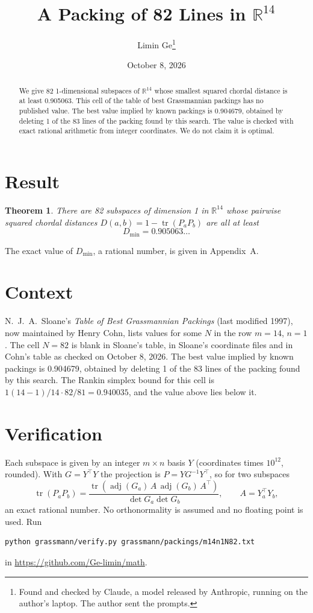 \documentclass[11pt,a4paper]{article}
\title{A Packing of 82 Lines in $\mathbb{R}^{14}$}
\author{Limin Ge\thanks{Found and checked by Claude, a model released by Anthropic, running on the author's laptop. The author sent the prompts.}}
\date{October 8, 2026}
\newtheorem*{theorem}{Theorem}
\begin{document}
\maketitle
\begin{abstract}
We give 82 1-dimensional subspaces of $\mathbb{R}^{14}$ whose smallest squared chordal distance is at least 0.905063. This cell of the table of best Grassmannian packings has no published value. The best value implied by known packings is 0.904679, obtained by deleting 1 of the 83 lines of the packing found by this search. The value is checked with exact rational arithmetic from integer coordinates. We do not claim it is optimal.
\end{abstract}

\section{Result}
\begin{theorem}
There are 82 subspaces of dimension 1 in $\mathbb{R}^{14}$ whose pairwise squared chordal distances $D(a,b) = 1 - \operatorname{tr}(P_aP_b)$ are all at least
\[ D_{\min} = 0.905063\ldots \]
\end{theorem}
The exact value of $D_{\min}$, a rational number, is given in Appendix~A.


\section{Context}
N.~J.~A.~Sloane's \emph{Table of Best Grassmannian Packings} (last modified 1997), now maintained by Henry Cohn, lists values for some $N$ in the row $m=14$, $n=1$. The cell $N=82$ is blank in Sloane's table, in Sloane's coordinate files and in Cohn's table as checked on October 8, 2026. The best value implied by known packings is 0.904679, obtained by deleting 1 of the 83 lines of the packing found by this search. The Rankin simplex bound for this cell is $1(14-1)/14\cdot 82/81 = 0.940035$, and the value above lies below it.


\section{Verification}
Each subspace is given by an integer $m\times n$ basis $Y$ (coordinates times $10^{12}$, rounded). With $G=Y^\top Y$ the projection is $P=YG^{-1}Y^\top$, so for two subspaces
\[ \operatorname{tr}(P_aP_b)=\frac{\operatorname{tr}(\operatorname{adj}(G_a)\,A\,\operatorname{adj}(G_b)\,A^\top)}{\det G_a\det G_b},\qquad A=Y_a^\top Y_b, \]
an exact rational number. No orthonormality is assumed and no floating point is used. Run
\begin{verbatim}
python grassmann/verify.py grassmann/packings/m14n1N82.txt
\end{verbatim}
in \url{https://github.com/Ge-limin/math}.
\end{document}
